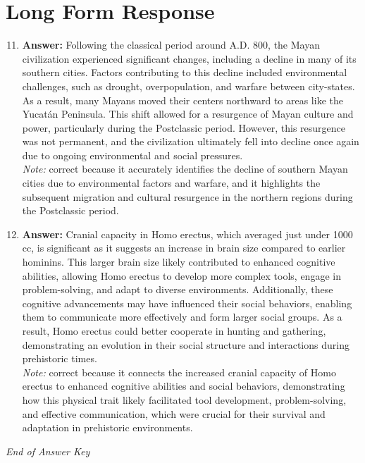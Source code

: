 \documentclass[12pt]{article}
\begin{document}
\section*{Long Form Response}
\begin{enumerate}[label=\arabic*.]
\setcounter{enumi}{10}
\item \textbf{Answer:} Following the classical period around A.D. 800, the Mayan civilization experienced significant changes, including a decline in many of its southern cities. Factors contributing to this decline included environmental challenges, such as drought, overpopulation, and warfare between city-states. As a result, many Mayans moved their centers northward to areas like the Yucatán Peninsula. This shift allowed for a resurgence of Mayan culture and power, particularly during the Postclassic period. However, this resurgence was not permanent, and the civilization ultimately fell into decline once again due to ongoing environmental and social pressures.
\\ \textit{Note:} correct because it accurately identifies the decline of southern Mayan cities due to environmental factors and warfare, and it highlights the subsequent migration and cultural resurgence in the northern regions during the Postclassic period.
\item \textbf{Answer:} Cranial capacity in Homo erectus, which averaged just under 1000 cc, is significant as it suggests an increase in brain size compared to earlier hominins. This larger brain size likely contributed to enhanced cognitive abilities, allowing Homo erectus to develop more complex tools, engage in problem-solving, and adapt to diverse environments. Additionally, these cognitive advancements may have influenced their social behaviors, enabling them to communicate more effectively and form larger social groups. As a result, Homo erectus could better cooperate in hunting and gathering, demonstrating an evolution in their social structure and interactions during prehistoric times.
\\ \textit{Note:} correct because it connects the increased cranial capacity of Homo erectus to enhanced cognitive abilities and social behaviors, demonstrating how this physical trait likely facilitated tool development, problem-solving, and effective communication, which were crucial for their survival and adaptation in prehistoric environments.
\end{enumerate}

\vfill
\noindent\textit{End of Answer Key}
\end{document}
